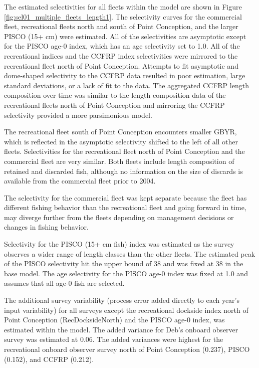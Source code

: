 \documentclass[12pt,]{article}
\begin{document}
The estimated selectivities for all fleets within the model are shown in
Figure \ref{fig:sel01_multiple_fleets_length1}. The selectivity curves
for the commercial fleet, recreational fleets north and south of Point
Conception, and the larger PISCO (15+ cm) were estimated. All of the
selectivities are asymptotic except for the PISCO age-0 index, which has
an age selectivity set to 1.0. All of the recreational indices and the
CCFRP index selectivities were mirrored to the recreational fleet north
of Point Conception. Attempts to fit asymptotic and dome-shaped
selectivity to the CCFRP data resulted in poor estimation, large
standard deviations, or a lack of fit to the data. The aggregated CCFRP
length composition over time was similar to the length composition data
of the recreational fleets north of Point Conception and mirroring the
CCFRP selectivity provided a more parsimonious model.

The recreational fleet south of Point Conception encounters smaller
GBYR, which is reflected in the asymptotic selectivity shifted to the
left of all other fleets. Selectivities for the recreational fleet north
of Point Conception and the commercial fleet are very similar. Both
fleets include length composition of retained and discarded fish,
although no information on the size of discards is available from the
commercial fleet prior to 2004.

The selectivity for the commercial fleet was kept separate because the
fleet has different fishing behavior than the recreational fleet and
going forward in time, may diverge further from the fleets depending on
management decisions or changes in fishing behavior.

Selectivity for the PISCO (15+ cm fish) index was estimated as the
survey observes a wider range of length classes than the other fleets.
The estimated peak of the PISCO selectivity hit the upper bound of 38
and was fixed at 38 in the base model. The age selectivity for the PISCO
age-0 index was fixed at 1.0 and assumes that all age-0 fish are
selected.

The additional survey variability (process error added directly to each
year's input variability) for all surveys except the recreational
dockside index north of Point Conception (RecDocksideNorth) and the
PISCO age-0 index, was estimated within the model. The added variance
for Deb's onboard observer survey was estimated at 0.06. The added
variances were highest for the recreational onboard observer survey
north of Point Conception (0.237), PISCO (0.152), and CCFRP (0.212).
\end{document}
